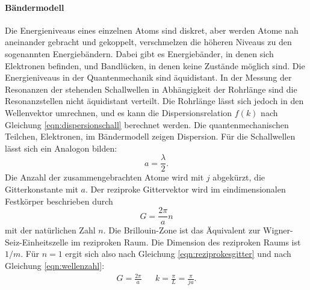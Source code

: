\paragraph{Bändermodell}
Die Energieniveaus eines einzelnen Atoms sind diskret, aber werden Atome nah aneinander gebracht und gekoppelt, verschmelzen die höheren Niveaus zu den sogenannten Energiebändern.
Dabei gibt es Energiebänder, in denen sich Elektronen befinden, und Bandlücken, in denen keine Zustände möglich sind.
Die Energieniveaus in der Quantenmechanik sind äquidistant.
In der Messung der Resonanzen der stehenden Schallwellen in Abhängigkeit der Rohrlänge sind die Resonanzstellen nicht äquidistant verteilt.
Die Rohrlänge lässt sich jedoch in den Wellenvektor umrechnen, und es kann die Dispersionsrelation $f(k)$ nach Gleichung \eqref{eqn:dispersionschall} berechnet werden.
Die quantenmechanischen Teilchen, Elektronen, im Bändermodell zeigen Dispersion.%
Für die Schallwellen lässt sich ein Analogon bilden:
\begin{equation}
  a = \frac{\lambda}{2}.
\end{equation}
Die Anzahl der zusammengebrachten Atome wird mit $j$ abgekürzt, die Gitterkonstante mit $a$.
Der reziproke Gittervektor wird im eindimensionalen Festkörper beschrieben durch
\begin{equation}
  G= \frac{2 \pi }{a} n
  \label{eqn:reziprokesgitter}
\end{equation}
mit der natürlichen Zahl $n$.
Die Brillouin-Zone ist das Äquivalent zur Wigner-Seiz-Einheitszelle im reziproken Raum.
Die Dimension des reziproken Raums ist $\si{1/m}$.
Für $n=1$ ergit sich also nach Gleichung \eqref{eqn:reziprokesgitter} und nach Gleichung \eqref{eqn:wellenzahl}:
\begin{align}
  G= \frac{2 \pi }{a}  && k = \frac{ \pi }{L} = \frac{\pi}{ j a}.
  \label{eqn:unsergitter}
\end{align}
